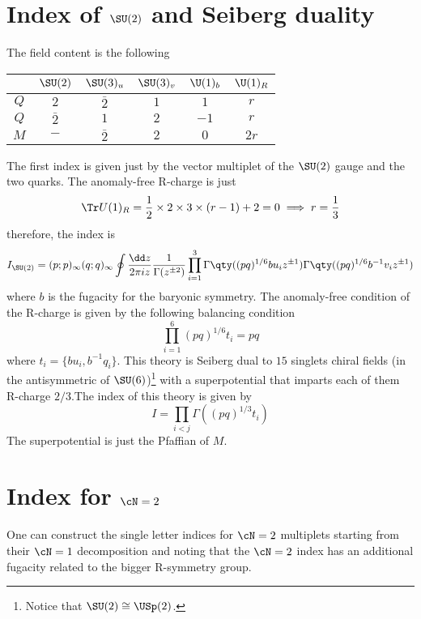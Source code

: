 \section{Index of $\SU(2)$ and Seiberg duality}
The field content is the following
\begin{table}[H]
\centering
\begin{tabular}{|c|c||c|c|c|c|}
	\hline
	&$\SU(2)$ &$\SU(3)_{u}$ & $\SU(3)_{v}$ & $\U(1)_{b}$ & $\U(1)_{R}$\\
	\hline
	$Q$ & $2$ & $\bar{2}$ & $1$ & $1$ &$r$\\
	$Q$ & $\bar{2}$ & $1$ & $2$ & $-1$ &$r$\\
	\hline\hline
	$M$ & $-$ & $\bar{2}$ & $2$ & $0$ &$2r$\\
	\hline
\end{tabular}
\end{table}
The first index is given just by the vector multiplet of the $\SU(2)$ gauge and the two quarks. The anomaly-free R-charge is just
\begin{equation}
	\Tr U(1)_{R}=\frac{1}{2}\times 2\times 3 \times (r-1)+2=0\implies r=\frac{1}{3}
\end{equation}
therefore, the index is
\begin{equation}
	I_{\SU(2)}=(p;p)_{\infty}(q;q)_{\infty}\oint\frac{\dd z}{2\pi i z}\frac{1}{\Gamma(z^{\pm 2})}\prod_{i=1}^{3}\Gamma\qty((pq)^{1/6}b u_{i}z^{\pm1})\Gamma\qty((pq)^{1/6}b^{-1} v_{i}z^{\pm1})
\end{equation}
where $b$ is the fugacity for the baryonic symmetry. The anomaly-free condition of the R-charge is given by the following balancing condition
\begin{equation}
	\prod_{i=1}^{6}(pq)^{1/6}t_{i}=pq
\end{equation}
where $t_{i}=\{b u_{i},b^{-1}q_{i}\}$. This theory is Seiberg dual to $15$ singlets chiral fields (in the antisymmetric of $\SU(6)$)\footnote{Notice that $\SU(2)\cong \USp(2)$.} with a superpotential that imparts each of them R-charge $2/3$.The index of this theory is given by
\begin{equation}
	I=\prod_{i<j}\Gamma((pq)^{1/3}t_{i})
\end{equation}
The superpotential is just the Pfaffian of $M$.
\section{Index for $\cN=2$}
One can construct the single letter indices for $\cN=2$ multiplets starting from their $\cN=1$ decomposition and noting that the $\cN=2$ index has an additional fugacity related to the bigger R-symmetry group.

